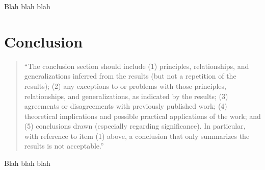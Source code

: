 \documentclass[]{report}   %
\begin{document}
Blah blah blah





\chapter{Conclusion}		%

\begin{quotation}
	``The conclusion section should include (1) principles, relationships, and generalizations inferred from the
	results (but not a repetition of the results); (2) any exceptions to or problems with those principles,
	relationships, and generalizations, as indicated by the results; (3) agreements or disagreements with previously
	published work; (4) theoretical implications and possible practical applications of the work; and (5) conclusions
	drawn (especially regarding significance). In particular, with reference to item (1) above, a conclusion that
	only summarizes the results is not acceptable.''
\end{quotation}


Blah blah blah






\begin{thebibliography}{9}
\end{thebibliography}
\end{document}
